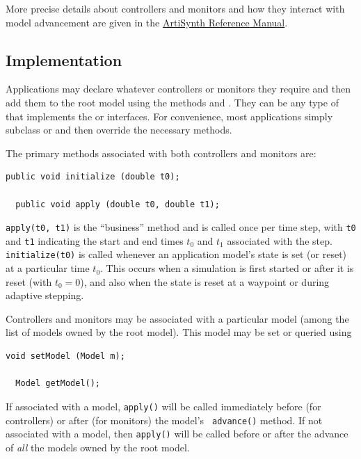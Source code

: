 More precise details about controllers and monitors and how they
interact with model advancement are given in the
\href{\artisynthDocBase/html/artisynth/artisynth.html}{
ArtiSynth Reference Manual}.

\subsection{Implementation}
\label{ControllerImplementation:sec}

Applications may declare whatever controllers or monitors they require
and then add them to the root model using the methods
 and
.
They can be any type of
 that implements
the  or
 interfaces.  For
convenience, most applications simply subclass
 or
 and then override
the necessary methods.

The primary methods associated with both controllers and
monitors are:
%
\begin{lstlisting}[]
  public void initialize (double t0);

  public void apply (double t0, double t1);
\end{lstlisting}
%
{\tt apply(t0, t1)} is the ``business'' method and is called once per
time step, with {\tt t0} and {\tt t1} indicating the start and end
times $t_0$ and $t_1$ associated with the step.  {\tt initialize(t0)}
is called whenever an application model's state is set (or reset) at a
particular time $t_0$. This occurs when a simulation is first started
or after it is reset (with $t_0 = 0$), and also when the state is
reset at a waypoint or during adaptive stepping.

Controllers and monitors may be associated with a particular model
(among the list of models owned by the root model). This model may be
set or queried using
%
\begin{lstlisting}[]
  void setModel (Model m);

  Model getModel();
\end{lstlisting}
%
If associated with a model, {\tt apply()} will be called immediately
before (for controllers) or after (for monitors) the model's {\tt
advance()} method. If not associated with a model, then {\tt apply()}
will be called before or after the advance of {\it all} the models
owned by the root model.

